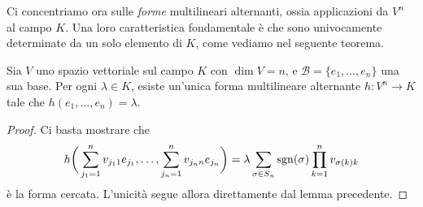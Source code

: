 Ci concentriamo ora sulle \emph{forme} multilineari alternanti, ossia applicazioni da $V^n$ al campo $K$.
Una loro caratteristica fondamentale è che sono univocamente determinate da un solo elemento di $K$, come vediamo nel seguente teorema.
\begin{teorema} \label{t:unicita-applicazione-multilineare-alternante}
	Sia $V$ uno spazio vettoriale sul campo $K$ con $\dim V=n$, e $\mathcal B=\{e_1,\dots,e_n\}$ una sua base.
	Per ogni $\lambda\in K$, esiste un'unica forma multilineare alternante $h\colon V^n\to K$ tale che $h(e_1,\dots,e_n)=\lambda$.
\end{teorema}
\begin{proof}
	Ci basta mostrare che
	\begin{equation}
		h\bigg(\sum_{j_1=1}^nv_{j_11}e_{j_1},\dots,\sum_{j_n=1}^nv_{j_nn}e_{j_n}\bigg)=\lambda\sum_{\sigma\in S_n}\operatorname{sgn}(\sigma)\prod_{k=1}^nv_{\sigma(k)k}
		\label{eq:unicita-applicazione-multilineare-alternante}
	\end{equation}
	è la forma cercata.
	L'unicità segue allora direttamente dal lemma precedente.


\end{proof}
